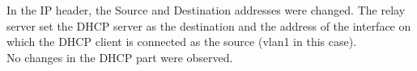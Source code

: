 In the IP header, the Source and Destination addresses were changed. The relay server set the DHCP server as the destination and the address of the interface on which the DHCP client is connected as the source (vlan1 in this case). \\
No changes in the DHCP part were observed. 
